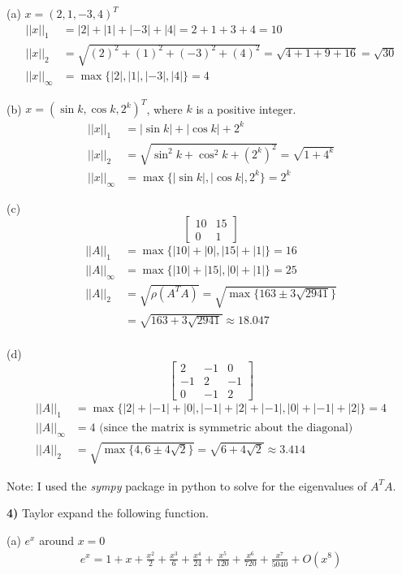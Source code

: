 \documentclass[12pt,a4paper]{article}
\newcommand{\prob}[2]{\textbf{#1)} #2}
\begin{document}
(a) $x = (2,1,-3,4)^{T}$
\begin{align*}
||x||_1 &= |2| + |1| + |-3| + |4| = 2 + 1 + 3 + 4 = 10 \\
||x||_2 &= \sqrt{(2)^2 + (1)^2 + (-3)^2 + (4)^2} = \sqrt{4 + 1 + 9 + 16} = \sqrt{30} \\
||x||_{\infty} &= \max\{|2|,|1|,|-3|,|4|\} = 4
\end{align*}

(b) $x = (\sin{k},\cos{k},2^{k})^{T}$, where $k$ is a positive integer.
\begin{align*}
||x||_1 &= |\sin{k}| + |\cos{k}| + 2^{k} \\
||x||_2 &= \sqrt{\sin^{2}{k} + \cos^{2}{k} + (2^{k})^2} = \sqrt{1 + 4^{k}} \\
||x||_{\infty} &= \max\{|\sin{k}|,|\cos{k}|,2^k\} = 2^{k}
\end{align*}

(c) 
\[
\begin{bmatrix}
10 & 15 \\
0  & 1
\end{bmatrix}
\]
\begin{align*}
||A||_1 &= \max\{|10|+|0|,|15|+|1|\} = 16 \\
||A||_{\infty} &= \max\{|10|+|15|,|0|+|1|\} = 25 \\
||A||_{2} &= \sqrt{\rho(A^{T}A)} = \sqrt{\max\{163 \pm 3\sqrt{2941}\}} \\
&= \sqrt{163 + 3\sqrt{2941}} \approx 18.047
\end{align*}\\

(d) 
\[
\begin{bmatrix}
2 & -1 & 0 \\
-1 & 2 & -1 \\
0 & -1 & 2
\end{bmatrix}
\]
\begin{align*}
||A||_1 &= \max\{|2|+|-1|+|0|,|-1|+|2|+|-1|,|0|+|-1|+|2|\} = 4 \\
||A||_{\infty} &= 4 \text{ (since the matrix is symmetric about the diagonal)} \\
||A||_{2} &= \sqrt{\max\{4,6 \pm 4\sqrt{2}\}} = \sqrt{6 + 4\sqrt{2}} \approx{3.414}
\end{align*}

Note: I used the \textit{sympy} package in python to solve for the eigenvalues of $A^{T}A$.

\prob{4}{Taylor expand the following function.}

(a) $e^x$ around $x = 0$
\begin{align*}
e^{x} = 1 + x + \frac{x^{2}}{2} + \frac{x^{3}}{6} + \frac{x^{4}}{24} + \frac{x^{5}}{120} + \frac{x^{6}}{720} + \frac{x^{7}}{5040} + O\left(x^{8}\right)
\end{align*}
\end{document}
